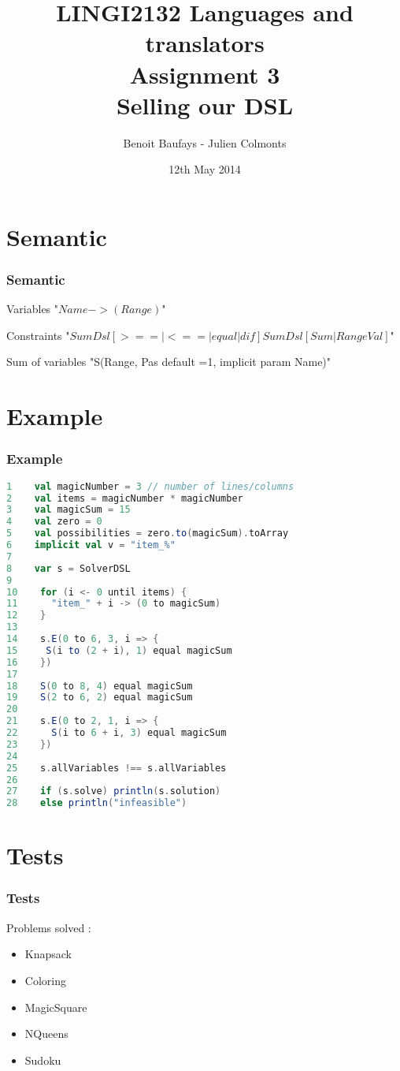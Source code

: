 \documentclass[usenames,dvipsnames]{beamer}
\title[LINGI2132 Assignment 3]{LINGI2132 Languages and translators \\ Assignment 3 \\ Selling our DSL} %
\author[Baufays - Colmonts] {Benoit Baufays - Julien Colmonts} %
\institute[INGI] %
{
Université Catholique de Louvain - INGI\\ %
\medskip
}
\date{12th May 2014} %
\begin{document}
\begin{frame}
\titlepage %
\end{frame}

\section{Semantic}
\begin{frame}
\frametitle{Semantic}
\begin{block}{Variables}
\center "$Name -> (Range)$"
\end{block}
\hspace{1cm}
\begin{block}{Constraints}
\center "$SumDsl [>==|<==|equal|dif] SumDsl [Sum|RangeVal]$"
\end{block}
\hspace{1cm}
\begin{block}{Sum of variables}
\center "S(Range, Pas default =1, implicit param Name)"
\end{block}


\end{frame}

\section{Example}
\begin{frame}[fragile]
\frametitle{Example}
\begin{lstlisting}[language=scala]
1    val magicNumber = 3 // number of lines/columns
2    val items = magicNumber * magicNumber
3    val magicSum = 15
4    val zero = 0
5    val possibilities = zero.to(magicSum).toArray
6    implicit val v = "item_%"
7
8    var s = SolverDSL
9
10    for (i <- 0 until items) {
11      "item_" + i -> (0 to magicSum)
12    }
13
14    s.E(0 to 6, 3, i => {
15     S(i to (2 + i), 1) equal magicSum
16    })
17
18    S(0 to 8, 4) equal magicSum
19    S(2 to 6, 2) equal magicSum
20
21    s.E(0 to 2, 1, i => {
22      S(i to 6 + i, 3) equal magicSum
23    })
24
25    s.allVariables !== s.allVariables
26
27    if (s.solve) println(s.solution)
28    else println("infeasible")
\end{lstlisting}
\end{frame}

\section{Tests}
\begin{frame}
\frametitle{Tests}
Problems solved : 
\begin{itemize}
\item Knapsack
\item Coloring
\item MagicSquare
\item NQueens
\item Sudoku
\end{itemize}
\end{frame}
\end{document}
